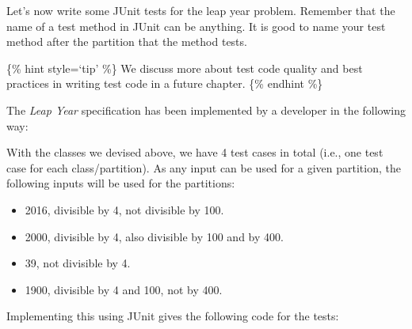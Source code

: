 Let's now write some JUnit tests for the leap year problem. Remember
that the name of a test method in JUnit can be anything. It is good to
name your test method after the partition that the method tests.

\{\% hint style=`tip' \%\} We discuss more about test code quality and
best practices in writing test code in a future chapter. \{\% endhint
\%\}

The \emph{Leap Year} specification has been implemented by a developer
in the following way:

\begin{Shaded}
\begin{Highlighting}[]
 

    \NormalTok{(}
    \NormalTok{ == }\NormalTok{)}
       \NormalTok{;}
    \NormalTok{ == }\NormalTok{)}
       \NormalTok{;}

    \NormalTok{ == }\NormalTok{;}
\NormalTok{  \}}
\NormalTok{\}}
\end{Highlighting}
\end{Shaded}

With the classes we devised above, we have 4 test cases in total (i.e.,
one test case for each class/partition). As any input can be used for a
given partition, the following inputs will be used for the partitions:

\begin{itemize}
\tightlist
\item
  2016, divisible by 4, not divisible by 100.
\item
  2000, divisible by 4, also divisible by 100 and by 400.
\item
  39, not divisible by 4.
\item
  1900, divisible by 4 and 100, not by 400.
\end{itemize}

Implementing this using JUnit gives the following code for the tests:


